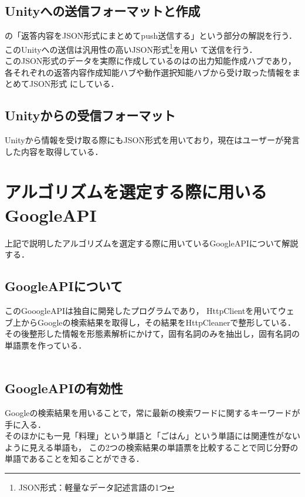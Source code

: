 \subsection{Unityへの送信フォーマットと作成}
の「返答内容をJSON形式にまとめてpush送信する」という部分の解説を行う．\\
このUnityへの送信は汎用性の高いJSON形式\footnote{JSON形式：軽量なデータ記述言語の1つ}を用い
て送信を行う．\\

このJSON形式のデータを実際に作成しているのはの出力知能作成ハブであり，
各それぞれの返答内容作成知能ハブや動作選択知能ハブから受け取った情報をまとめてJSON形式
にしている．\\


\subsection{Unityからの受信フォーマット}
Unityから情報を受け取る際にもJSON形式を用いており，現在はユーザーが発言した内容を取得している．\\


\newpage

\section{アルゴリズムを選定する際に用いるGoogleAPI}
上記で説明したアルゴリズムを選定する際に用いているGoogleAPIについて解説する．\\

\subsection{GoogleAPIについて}
このGooogleAPIは独自に開発したプログラムであり，
HttpClientを用いてウェブ上からGoogleの検索結果を取得し，その結果をHttpCleanerで整形している．\\
その後整形した情報を形態素解析にかけて，固有名詞のみを抽出し，固有名詞の単語票を作っている．\\
\\

\subsection{GoogleAPIの有効性}
Googleの検索結果を用いることで，常に最新の検索ワードに関するキーワードが手に入る．
\\
そのほかにも一見「料理」という単語と「ごはん」という単語には関連性がないように見える単語も，
この2つの検索結果の単語票を比較することで同じ分野の単語であることを知ることができる．\\